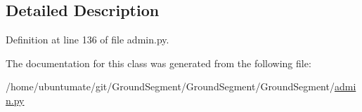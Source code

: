 \subsection{Detailed Description}


Definition at line 136 of file admin.\+py.



The documentation for this class was generated from the following file\+:\begin{DoxyCompactItemize}
\item 
/home/ubuntumate/git/\+Ground\+Segment/\+Ground\+Segment/\+Ground\+Segment/\hyperlink{admin_8py}{admin.\+py}\end{DoxyCompactItemize}
